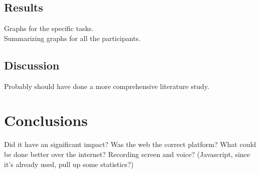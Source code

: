 \documentclass[nofilelist]{cslthse-msc}
\begin{document}
  \section{Results}
    \noindent
    Graphs for the specific tasks. \\
    Summarizing graphs for all the participants.
  \section{Discussion}
    Probably should have done a more comprehensive literature study. \\
\chapter{Conclusions}
  Did it have an significant impact? Was the web the correct platform? What
  could be done better over the internet? Recording screen and voice?
  (Javascript, since it's already used, pull up some statistics?)

{}

\checkoddpage
\ifoddpage
\else
   \newpage
   \thispagestyle{empty}
   \mbox{ }
\fi
%
\end{document}

